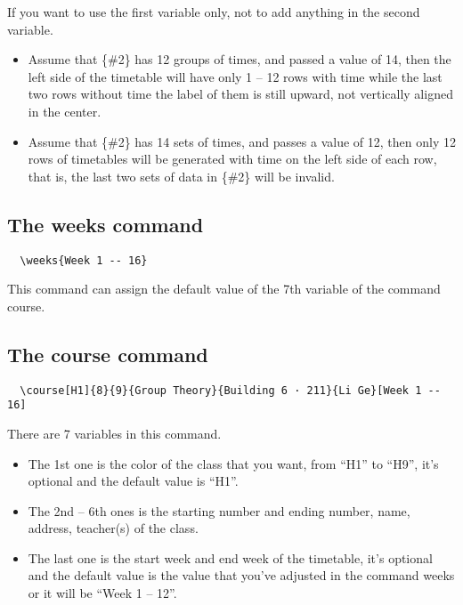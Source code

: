 \documentclass[11pt]{article}
\def\cmd#1{\texorpdfstring{\textcolor{cmdcolor}{\textsf{#1}}}{“#1”}}
\begin{document}
If you want to use the first variable \cmd{\ttfamily[\#1]} only, not to add anything in the second variable.

\begin{itemize}
  \item Assume that \cmd{\ttfamily\{\#2\}} has 12 groups of times, and \cmd{\ttfamily[\#1]} passed a value of 14, then the left side of the timetable will have only 1 -- 12 rows with time while the last two rows without time the label of them is still upward, not vertically aligned in the center.
  \item Assume that \cmd{\ttfamily\{\#2\}} has 14 sets of times, and \cmd{\ttfamily[\#1]} passes a value of 12, then only 12 rows of timetables will be generated with time on the left side of each row, that is, the last two sets of data in \cmd{\ttfamily\{\#2\}} will be invalid.
\end{itemize}

\subsection{The \cmd{weeks} command}
\begin{verbatim}
  \weeks{Week 1 -- 16}
\end{verbatim}

This command can assign the default value of the 7th variable of the command \cmd{course}.

\subsection{The \cmd{course} command}
\begin{verbatim}
  \course[H1]{8}{9}{Group Theory}{Building 6 · 211}{Li Ge}[Week 1 -- 16]
\end{verbatim}

There are 7 variables in this command.
\begin{itemize}
  \item The 1st one is the color of the class that you want, from ``H1'' to ``H9'', it's optional and the default value is ``H1''.
  \item The 2nd -- 6th ones is the starting number and ending number, name, address, teacher(s) of the class.
  \item The last one is the start week and end week of the timetable, it's optional and the default value is the value that you've adjusted in the command \cmd{weeks} or it will be ``Week 1 -- 12''.
\end{itemize}
\end{document}
